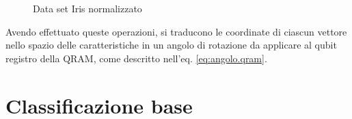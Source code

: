 \begin{figure}[htb]
    \myfloatalign
     \quad
    \caption{Data set Iris normalizzato}
    \label{fig:iris_normal}
\end{figure}


Avendo effettuato queste operazioni, si traducono le coordinate 
di ciascun vettore nello spazio delle caratteristiche in un angolo di rotazione 
da applicare al qubit registro della \ac{QRAM}, come descritto nell'eq. \ref{eq:angolo.qram}. 

\section{Classificazione base}


